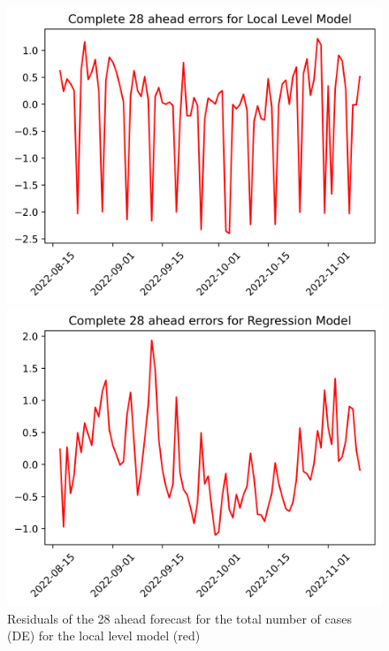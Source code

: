 \begin{figure}

\begin{minipage}{.32\textwidth}
  \centering
  \includegraphics[width=\linewidth]{pics/28_ah/DE_28_ahead_errors_Local Level Model.png}
  \caption{Residuals of the 28 ahead forecast for the total number of cases (DE) for the local level model (red)}
  \label{fig:tot_cases_error_28_LLM_DE}
\end{minipage}
\begin{minipage}{.32\textwidth}
  \centering
  \includegraphics[width=\linewidth]{pics/28_ah/28_ahead_errors_Regression Model.png}

\end{minipage}
\end{figure}
